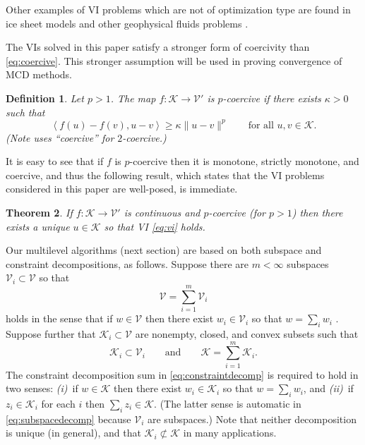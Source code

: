 \documentclass[letterpaper,final,12pt,reqno]{amsart}
\theoremstyle{cstyle}
\newtheorem{theorem}{Theorem}
\theoremstyle{dstyle}
\newtheorem{definition}[theorem]{Definition}
\numberwithin{equation}{section}
\numberwithin{figure}{section}
\numberwithin{table}{section}
\numberwithin{theorem}{section}
\newcommand{\cK}{\mathcal{K}}
\newcommand{\cV}{\mathcal{V}}
\newcommand{\ip}[2]{\left<#1,#2\right>}
\begin{document}
Other examples of VI problems which are not of optimization type are found in ice sheet models \cite{Calvoetal2002,JouvetBueler2012} and other geophysical fluids problems \cite{Bueler2021conservation}.

The VIs solved in this paper satisfy a stronger form of coercivity than \eqref{eq:coercive}.  This stronger assumption will be used in proving convergence of MCD methods.

\begin{definition}  Let $p>1$.  The map $f:\cK \to \cV'$ is \emph{$p$-coercive} if there exists $\kappa>0$ such that
\begin{equation}
\ip{f(u)-f(v)}{u-v} \ge \kappa \|u-v\|^p \qquad \text{for all } u,v \in \cK. \label{eq:pcoercive}
\end{equation}
(Note \cite{Tai2003} uses ``coercive'' for $2$-coercive.)
\end{definition}

It is easy to see that if $f$ is $p$-coercive then it is monotone, strictly monotone, and coercive, and thus the following result, which states that the VI problems considered in this paper are well-posed, is immediate.

\begin{theorem}  \label{thm:viwellposed}  If $f:\cK \to \cV'$ is continuous and $p$-coercive (for $p>1$) then there exists a unique $u\in \cK$ so that VI \eqref{eq:vi} holds.
\end{theorem}

Our multilevel algorithms (next section) are based on both subspace and constraint decompositions, as follows.  Suppose there are $m<\infty$ subspaces $\cV_i \subset \cV$ so that
\begin{equation}
\cV = \sum_{i=1}^m \cV_i \label{eq:subspacedecomp}
\end{equation}
holds in the sense that if $w \in \cV$ then there exist $w_i \in \cV_i$ so that $w = \sum_i w_i$ \cite{Xu1992}.  Suppose further that $\cK_i \subset \cV$ are nonempty, closed, and convex subsets such that
\begin{equation}
\cK_i \subset \cV_i \qquad \text{and} \qquad \cK = \sum_{i=1}^m \cK_i. \label{eq:constraintdecomp}
\end{equation}
The constraint decomposition \cite{Tai2003} sum in \eqref{eq:constraintdecomp} is required to hold in two senses: \emph{(i)}~if $w \in \cK$ then there exist $w_i \in \cK_i$ so that $w = \sum_i w_i$, and \emph{(ii)}~if $z_i \in \cK_i$ for each $i$ then $\sum_i z_i \in \cK$.  (The latter sense is automatic in \eqref{eq:subspacedecomp} because $\cV_i$ are subspaces.)  Note that neither decomposition is unique (in general), and that $\cK_i \not\subset \cK$ in many applications.
\end{document}
